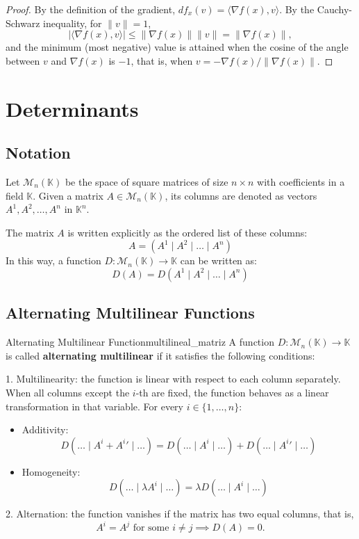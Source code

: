 \documentclass[11pt, a4paper]{article}
\begin{document}
\begin{proof}
By the definition of the gradient, $df_x(v) = \langle \nabla f(x), v \rangle$. By the Cauchy-Schwarz inequality, for $\|v\| = 1$,
\[
|\langle \nabla f(x), v \rangle| \le \|\nabla f(x)\| \|v\| = \|\nabla f(x)\|,
\]
and the minimum (most negative) value is attained when the cosine of the angle between $v$ and $\nabla f(x)$ is $-1$, that is, when $v = -\nabla f(x)/\|\nabla f(x)\|$.
\end{proof}

\newpage

\section{Determinants}

\subsection{Notation}

Let $\mathcal{M}_{n}(\mathbb{K})$ be the space of square matrices of size $n \times n$ with coefficients in a field $\mathbb{K}$.
Given a matrix $A \in \mathcal{M}_{n}(\mathbb{K})$, its columns are denoted as vectors $A^1, A^2, \dots, A^n$ in $\mathbb{K}^n$.

The matrix $A$ is written explicitly as the ordered list of these columns:
\[
A = (A^1 \mid A^2 \mid \dots \mid A^n)
\]
In this way, a function $D: \mathcal{M}_{n}(\mathbb{K}) \to \mathbb{K}$ can be written as:
\[
D(A) = D(A^1 \mid A^2 \mid \dots \mid A^n)
\]

\subsection{Alternating Multilinear Functions}

\begin{definicion}{Alternating Multilinear Function}{multilineal_matriz}
A function $D: \mathcal{M}_{n}(\mathbb{K}) \to \mathbb{K}$ is called \textbf{alternating multilinear} if it satisfies the following conditions:

1. Multilinearity: the function is linear with respect to each column separately. When all columns except the $i$-th are fixed, the function behaves as a linear transformation in that variable.
For every $i \in \{1, \dots, n\}$:
\begin{itemize}
    \item Additivity:
    \[ D(\dots \mid A^i + {A^i}' \mid \dots) = D(\dots \mid A^i \mid \dots) + D(\dots \mid {A^i}' \mid \dots) \]
    \item Homogeneity:
    \[ D(\dots \mid \lambda A^i \mid \dots) = \lambda D(\dots \mid A^i \mid \dots) \]
\end{itemize}

2. Alternation: the function vanishes if the matrix has two equal columns, that is,
\[
A^i = A^j \text{ for some } i \neq j \implies D(A) = 0.
\]
\end{definicion}
\end{document}
